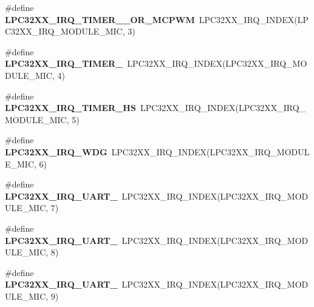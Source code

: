 \begin{DoxyCompactItemize}
\mbox{\label{group__lpc32xx__interrupt_ga1ab4ee4c529f0ca2572152c5b11a9dd0}} 
\#define {\bfseries L\+P\+C32\+X\+X\+\_\+\+I\+R\+Q\+\_\+\+T\+I\+M\+E\+R\+\_\+\_\+\+O\+R\+\_\+\+M\+C\+P\+WM}~L\+P\+C32\+X\+X\+\_\+\+I\+R\+Q\+\_\+\+I\+N\+D\+EX(L\+P\+C32\+X\+X\+\_\+\+I\+R\+Q\+\_\+\+M\+O\+D\+U\+L\+E\+\_\+\+M\+IC, 3)
\item 
\mbox{\label{group__lpc32xx__interrupt_gab49f92d1336cfae88df1478137848142}} 
\#define {\bfseries L\+P\+C32\+X\+X\+\_\+\+I\+R\+Q\+\_\+\+T\+I\+M\+E\+R\+\_}~L\+P\+C32\+X\+X\+\_\+\+I\+R\+Q\+\_\+\+I\+N\+D\+EX(L\+P\+C32\+X\+X\+\_\+\+I\+R\+Q\+\_\+\+M\+O\+D\+U\+L\+E\+\_\+\+M\+IC, 4)
\item 
\mbox{\label{group__lpc32xx__interrupt_ga502fd4cd8108b21ffe40fc499cf89e11}} 
\#define {\bfseries L\+P\+C32\+X\+X\+\_\+\+I\+R\+Q\+\_\+\+T\+I\+M\+E\+R\+\_\+\+HS}~L\+P\+C32\+X\+X\+\_\+\+I\+R\+Q\+\_\+\+I\+N\+D\+EX(L\+P\+C32\+X\+X\+\_\+\+I\+R\+Q\+\_\+\+M\+O\+D\+U\+L\+E\+\_\+\+M\+IC, 5)
\item 
\mbox{\label{group__lpc32xx__interrupt_gac2fc2b4459bb9725f5e8bbc7a2dc9e57}} 
\#define {\bfseries L\+P\+C32\+X\+X\+\_\+\+I\+R\+Q\+\_\+\+W\+DG}~L\+P\+C32\+X\+X\+\_\+\+I\+R\+Q\+\_\+\+I\+N\+D\+EX(L\+P\+C32\+X\+X\+\_\+\+I\+R\+Q\+\_\+\+M\+O\+D\+U\+L\+E\+\_\+\+M\+IC, 6)
\item 
\mbox{\label{group__lpc32xx__interrupt_gae64b569da4633a80d3112dec533b3177}} 
\#define {\bfseries L\+P\+C32\+X\+X\+\_\+\+I\+R\+Q\+\_\+\+U\+A\+R\+T\+\_}~L\+P\+C32\+X\+X\+\_\+\+I\+R\+Q\+\_\+\+I\+N\+D\+EX(L\+P\+C32\+X\+X\+\_\+\+I\+R\+Q\+\_\+\+M\+O\+D\+U\+L\+E\+\_\+\+M\+IC, 7)
\item 
\mbox{\label{group__lpc32xx__interrupt_ga0c5140d138ca72e78aa17fc12c711d2e}} 
\#define {\bfseries L\+P\+C32\+X\+X\+\_\+\+I\+R\+Q\+\_\+\+U\+A\+R\+T\+\_}~L\+P\+C32\+X\+X\+\_\+\+I\+R\+Q\+\_\+\+I\+N\+D\+EX(L\+P\+C32\+X\+X\+\_\+\+I\+R\+Q\+\_\+\+M\+O\+D\+U\+L\+E\+\_\+\+M\+IC, 8)
\item 
\mbox{\label{group__lpc32xx__interrupt_gaba57543fd7af87c0b08fb11085a6b86f}} 
\#define {\bfseries L\+P\+C32\+X\+X\+\_\+\+I\+R\+Q\+\_\+\+U\+A\+R\+T\+\_}~L\+P\+C32\+X\+X\+\_\+\+I\+R\+Q\+\_\+\+I\+N\+D\+EX(L\+P\+C32\+X\+X\+\_\+\+I\+R\+Q\+\_\+\+M\+O\+D\+U\+L\+E\+\_\+\+M\+IC, 9)

\end{DoxyCompactItemize}
